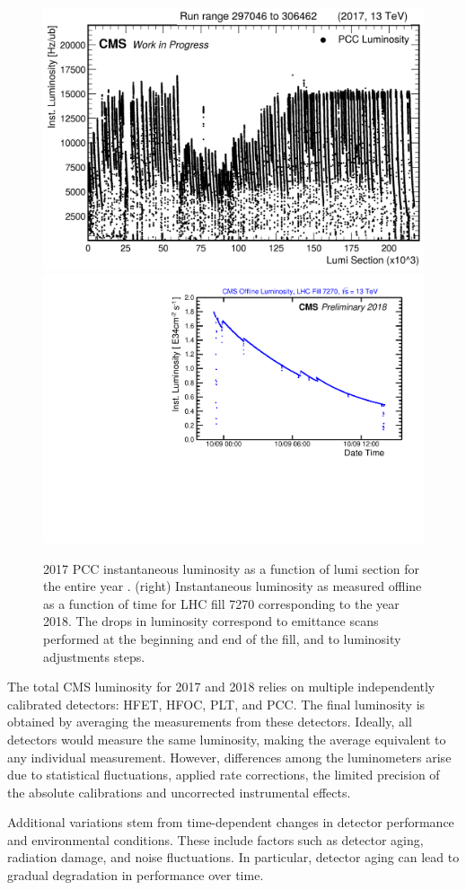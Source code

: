 \begin{figure}[h!]
    \centering
    \includegraphics[width=.47\textwidth]{figures/performance_PCC/Lumi_2017.png}
    \includegraphics[width=.45\textwidth]{figures/LumiVsTime_fill7270.pdf}
    \caption[PCC Instantaneous Luminosity (Entire Year 2017) and Fill 7270 (2018)]{2017 PCC instantaneous luminosity as a function of lumi section for the entire year . (right) Instantaneous luminosity as measured offline as a function of time for LHC fill 7270 corresponding to the year 2018. The drops in luminosity correspond to emittance scans performed at the beginning and end of the fill, and to luminosity adjustments steps.}
    \label{Lumi_2017}
\end{figure}



The total CMS luminosity for 2017 and 2018 relies on multiple independently calibrated detectors: HFET, HFOC, PLT, and PCC. The final luminosity is obtained by averaging the measurements from these detectors. Ideally, all detectors would measure the same luminosity, making the average equivalent to any individual measurement. However, differences among the luminometers arise due to statistical fluctuations, applied rate corrections, the limited precision of the absolute calibrations and uncorrected instrumental effects.

Additional variations stem from time-dependent changes in detector performance and environmental conditions. These include factors such as detector aging, radiation damage, and noise fluctuations. In particular, detector aging can lead to gradual degradation in performance over time.

